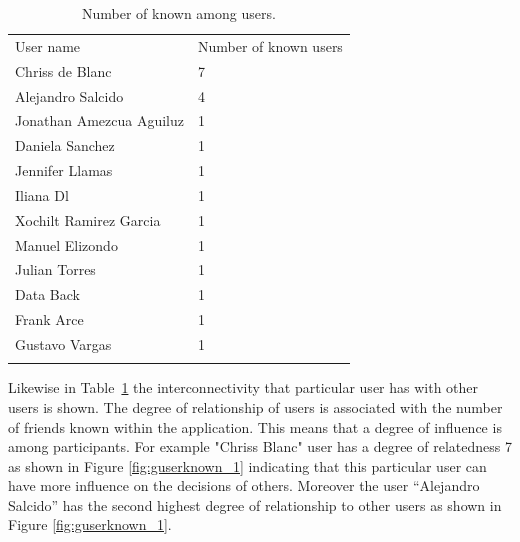 \begin{table}
\small
\caption{Number of known among users.}
\label{tab:knownUsers_1}
\centering
\small
\begin{tabular}{p{3cm} p{3cm}  }
\hline\noalign{\smallskip}
 User name & Number of known users \\
\noalign{\smallskip}\hline\noalign{\smallskip}
\small{Chriss de Blanc } & \small{7}  \\ \hline
\small{Alejandro Salcido } & \small{4}  \\ \hline
\small{Jonathan Amezcua Aguiluz } & \small{1}  \\ \hline
\small{Daniela Sanchez } & \small{1}  \\ \hline
\small{Jennifer Llamas} & \small{1}  \\ \hline
\small{Iliana Dl } & \small{1}  \\ \hline
\small{Xochilt Ramirez Garcia } & \small{1}  \\ \hline
\small{Manuel Elizondo } & \small{1}  \\ \hline
\small{Julian Torres } & \small{1}  \\ \hline
\small{Data Back } & \small{1}  \\ \hline
\small{Frank Arce } & \small{1}  \\ \hline
\small{Gustavo Vargas } & \small{1}  \\ \hline
\noalign{\smallskip}\hline
\end{tabular}
\end{table}

Likewise in Table~\ref{tab:knownUsers_1} the interconnectivity that particular
user has with other users is shown. The degree of relationship of users is
associated with the number of friends known within the application. This means
that a degree of influence is among participants. For example  "Chriss
Blanc" user has a degree of relatedness 7 as shown in Figure
\ref{fig:guserknown_1} indicating that this particular user can have more
influence on the decisions of others. Moreover the user ``Alejandro Salcido'' has
the second highest degree of relationship to other users as shown in Figure
\ref{fig:guserknown_1}.

